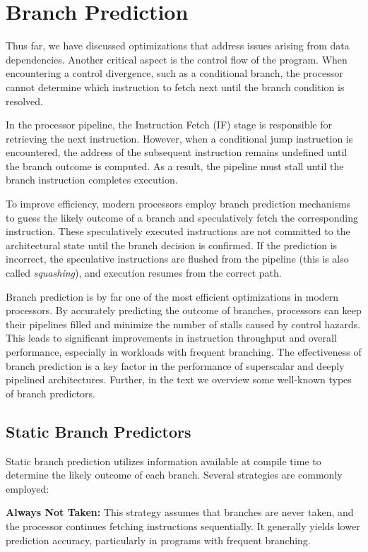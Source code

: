 \section{Branch Prediction}

Thus far, we have discussed optimizations that address issues arising from data dependencies. Another critical aspect is the control flow of the program. When encountering a control divergence, such as a conditional branch, the processor cannot determine which instruction to fetch next until the branch condition is resolved.

In the processor pipeline, the Instruction Fetch (IF) stage is responsible for retrieving the next instruction. However, when a conditional jump instruction is encountered, the address of the subsequent instruction remains undefined until the branch outcome is computed. As a result, the pipeline must stall until the branch instruction completes execution.

To improve efficiency, modern processors employ branch prediction mechanisms to guess the likely outcome of a branch and speculatively fetch the corresponding instruction. These speculatively executed instructions are not committed to the architectural state until the branch decision is confirmed. If the prediction is incorrect, the speculative instructions are flushed from the pipeline (this is also called \textit{squashing}), and execution resumes from the correct path.

Branch prediction is by far one of the most efficient optimizations in modern processors. By accurately predicting the outcome of branches, processors can keep their pipelines filled and minimize the number of stalls caused by control hazards. This leads to significant improvements in instruction throughput and overall performance, especially in workloads with frequent branching. The effectiveness of branch prediction is a key factor in the performance of superscalar and deeply pipelined architectures. Further, in the text we overview some well-known types of branch predictors.

\subsection{Static Branch Predictors}

Static branch prediction utilizes information available at compile time to determine the likely outcome of each branch. Several strategies are commonly employed:

\textbf{Always Not Taken:} This strategy assumes that branches are never taken, and the processor continues fetching instructions sequentially. It generally yields lower prediction accuracy, particularly in programs with frequent branching.

